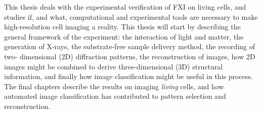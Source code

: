 This thesis deals with the experimental verification of FXI on living cells, and studies if, and what, computational and experimental tools are necessary to make high-resolution cell imaging a reality. This thesis will start by describing the general framework of the experiment: the interaction of light and matter, the generation of X-rays, the substrate-free sample delivery method, the recording of two- dimensional (2D) diffraction patterns, the reconstruction of images, how 2D images might be combined to derive three-dimensional (3D) structural information, and finally how image classification might be useful in this process. The final chapters describe the results on imaging \textit{living} cells, and how automated image classification has contributed to pattern selection and reconstruction.